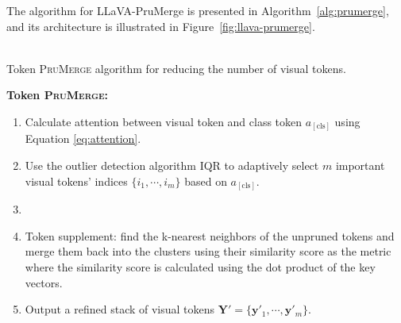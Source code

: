 \documentclass[onecolumn]{IEEEtran}
\begin{document}
The algorithm for LLaVA-PruMerge is presented in Algorithm~\ref{alg:prumerge}, and its architecture is illustrated in Figure~\ref{fig:llava-prumerge}.
\\
\\
\begin{algorithm}[H]
    \SetAlgoLined
    \caption{Token \textsc{PruMerge} algorithm for reducing the number of visual tokens. \cite{shang2024LLaVA-PruMerge}}
    
    \textbf{Token \textsc{PruMerge}:}
    
    \begin{enumerate}
        \item Calculate attention between visual token and class token $a_{[\text{cls}]}$ using Equation \ref{eq:attention}.
        \item Use the outlier detection algorithm IQR to adaptively select $m$ important visual tokens' indices $\{i_1, \cdots, i_m\}$ based on $a_{[\text{cls}]}$.
        \item {}
        \item Token supplement: find the k-nearest neighbors of the unpruned tokens and merge them back into the clusters using their similarity score as the metric where the similarity score is calculated using the dot product of the key vectors.
        \item Output a refined stack of visual tokens $\mathbf{Y}' = \{\mathbf{y}'_1, \cdots, \mathbf{y}'_m\}$.
    \end{enumerate}
    \label{alg:prumerge}    
\end{algorithm}
\end{document}
